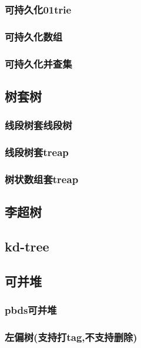 \documentclass[a4paper,twocolumn]{article}
\begin{document}
\subsubsection{可持久化01trie}

\subsubsection{可持久化数组}

\subsubsection{可持久化并查集}

\subsection{树套树}
\subsubsection{线段树套线段树}

\subsubsection{线段树套treap}

\subsubsection{树状数组套treap}

\subsection{李超树}

\subsection{kd-tree}

\subsection{可并堆}
\subsubsection{pbds可并堆}

\subsubsection{左偏树(支持打tag,不支持删除)}

\end{document}
